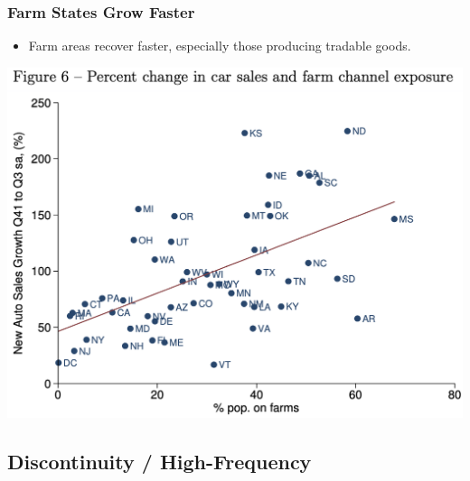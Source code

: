 \documentclass[english,xcolor=svgnames]{beamer}
\begin{document}
\begin{frame}
\frametitle[alignment=center]{Farm States Grow Faster}
\begin{itemize}
	\item Farm areas recover faster, especially those producing tradable goods.
\end{itemize}
\centering
\includegraphics[scale=0.5]{../../Images/HRWFIG6a.png}
\end{frame}


\subsection{Discontinuity / High-Frequency}
\end{document}
